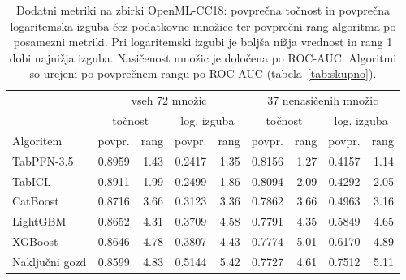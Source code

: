 \begin{table}[H]
\centering
\caption{Dodatni metriki na zbirki OpenML-CC18: povprečna točnost in povprečna logaritemska izguba čez podatkovne množice ter povprečni rang algoritma po posamezni metriki. Pri logaritemski izgubi je boljša nižja vrednost in rang 1 dobi najnižja izguba. Nasičenost množic je določena po ROC-AUC. Algoritmi so urejeni po povprečnem rangu po ROC-AUC (tabela~\ref{tab:skupno}).}
\label{tab:metrike}
\footnotesize
\setlength{\tabcolsep}{3pt}
\begin{tabular}{lrrrrrrrr}
\hline
 & \multicolumn{4}{c}{vseh 72 množic} & \multicolumn{4}{c}{37 nenasičenih množic} \\
 & \multicolumn{2}{c}{točnost} & \multicolumn{2}{c}{log. izguba} & \multicolumn{2}{c}{točnost} & \multicolumn{2}{c}{log. izguba} \\
Algoritem & povpr. & rang & povpr. & rang & povpr. & rang & povpr. & rang \\
\hline
TabPFN-3.5 & \num{0.8959} & \num{1.43} & \num{0.2417} & \num{1.35} & \num{0.8156} & \num{1.27} & \num{0.4157} & \num{1.14} \\
TabICL & \num{0.8911} & \num{1.99} & \num{0.2499} & \num{1.86} & \num{0.8094} & \num{2.09} & \num{0.4292} & \num{2.05} \\
CatBoost & \num{0.8716} & \num{3.66} & \num{0.3123} & \num{3.36} & \num{0.7862} & \num{3.66} & \num{0.4963} & \num{3.16} \\
LightGBM & \num{0.8652} & \num{4.31} & \num{0.3709} & \num{4.58} & \num{0.7791} & \num{4.35} & \num{0.5849} & \num{4.65} \\
XGBoost & \num{0.8646} & \num{4.78} & \num{0.3807} & \num{4.43} & \num{0.7774} & \num{5.01} & \num{0.6170} & \num{4.89} \\
Naključni gozd & \num{0.8599} & \num{4.83} & \num{0.5144} & \num{5.42} & \num{0.7727} & \num{4.61} & \num{0.7512} & \num{5.11} \\
\hline
\end{tabular}
\end{table}
